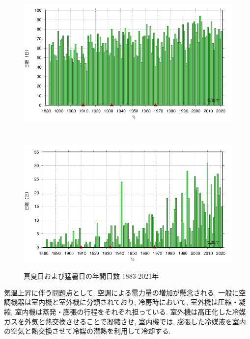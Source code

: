 \documentclass[a4j,fleqn,dvipdfmx,uplatex]{jsarticle}
\begin{document}
\begin{figure}[htb]
  \centering
  \begin{minipage}[b]{\linewidth}
      \centering
      \includegraphics[width=\linewidth]{img/OSAKA_tmaxGE30.png}
      \label{subfig1:temp_osaka}
    \end{minipage}\\
    \begin{minipage}[b]{\linewidth}
      \centering
      \includegraphics[width=\linewidth]{img/OSAKA_tmaxGE35.png}
      \label{subfig1:temp_osaka2}
    \end{minipage}
    \caption{真夏日および猛暑日の年間日数 1883-2021年\cite{temp_osaka3}}
    \label{fig1:temp_osaka}
\end{figure}
 
気温上昇に伴う問題点として, 空調による電力量の増加が懸念される. 
一般に空調機器は室内機と室外機に分類されており, 
冷房時において, 室外機は圧縮・凝縮, 室内機は蒸発・膨張の行程をそれぞれ担っている. 
室外機は高圧化した冷媒ガスを外気と熱交換させることで凝縮させ, 
室内機では, 膨張した冷媒液を室内の空気と熱交換させて冷媒の潜熱を利用して冷却する. 
\end{document}
